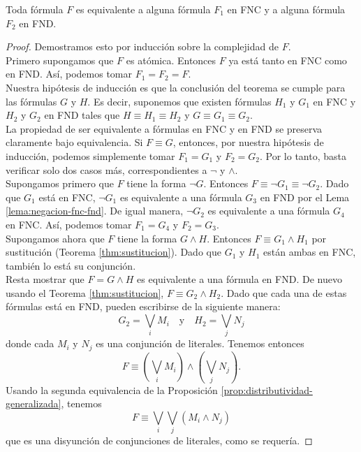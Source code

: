 \documentclass[12pt,a4paper]{book}
\begin{document}
    \begin{teorema}\label{thm:existencia-fnc-fnd}
        Toda fórmula $F$ es equivalente a alguna fórmula $F_{1}$ en FNC y a alguna fórmula $F_{2}$ en FND.
    \end{teorema}
    \begin{proof}
        Demostramos esto por inducción sobre la complejidad de $F$.\\
        Primero supongamos que $F$ es atómica. Entonces $F$ ya está tanto en FNC como en FND. Así, podemos tomar $F_{1}=F_{2}=F$.\\
        Nuestra hipótesis de inducción es que la conclusión del teorema se cumple para las fórmulas $G$ y $H$. Es decir,
        suponemos que existen fórmulas $H_{1}$ y $G_{1}$ en FNC y $H_{2}$ y $G_{2}$ en FND tales que $H\equiv H_{1}\equiv H_{2}$
        y $G\equiv G_{1}\equiv G_{2}$.\\
        La propiedad de ser equivalente a fórmulas en FNC y en FND se preserva claramente bajo equivalencia. Si $F\equiv G$,
        entonces, por nuestra hipótesis de inducción, podemos simplemente tomar $F_{1}=G_{1}$ y $F_{2}=G_{2}$. Por lo tanto,
        basta verificar solo dos casos más, correspondientes a $\neg$ y $\wedge$.\\
        Supongamos primero que $F$ tiene la forma $\neg G$. Entonces $F\equiv\neg G_{1}\equiv\neg G_{2}$. Dado que $G_{1}$ está
        en FNC, $\neg G_{1}$ es equivalente a una fórmula $G_{3}$ en FND por el Lema \ref{lema:negacion-fnc-fnd}. De igual
        manera, $\neg G_{2}$ es equivalente a una fórmula $G_{4}$ en FNC. Así, podemos tomar $F_{1}=G_{4}$ y $F_{2}=G_{3}$.\\
        Supongamos ahora que $F$ tiene la forma $G\wedge H$. Entonces $F\equiv G_{1}\wedge H_{1}$ por sustitución (Teorema
        \ref{thm:sustitucion}). Dado que $G_{1}$ y $H_{1}$ están ambas en FNC, también lo está su conjunción.\\
        Resta mostrar que $F=G\wedge H$ es equivalente a una fórmula en FND. De nuevo usando el Teorema
        \ref{thm:sustitucion}, $F\equiv G_{2}\wedge H_{2}$. Dado que cada una de estas fórmulas está en FND, pueden escribirse
        de la siguiente manera:
        \begin{equation*}
            G_{2}=\bigvee_{i}M_{i}\quad\text{y}\quad H_{2}=\bigvee_{j}N_{j}
        \end{equation*}
        donde cada $M_{i}$ y $N_{j}$ es una conjunción de literales. Tenemos entonces
        \begin{equation*}
            F\equiv\left(\bigvee_{i}M_{i}\right)\wedge\left(\bigvee_{j}N_{j}\right).
        \end{equation*}
        Usando la segunda equivalencia de la Proposición \ref{prop:distributividad-generalizada}, tenemos
        \begin{equation*}
            F\equiv\bigvee_{i}\bigvee_{j}(M_{i}\wedge N_{j})
        \end{equation*}
        que es una disyunción de conjunciones de literales, como se requería.
    \end{proof}
\end{document}
